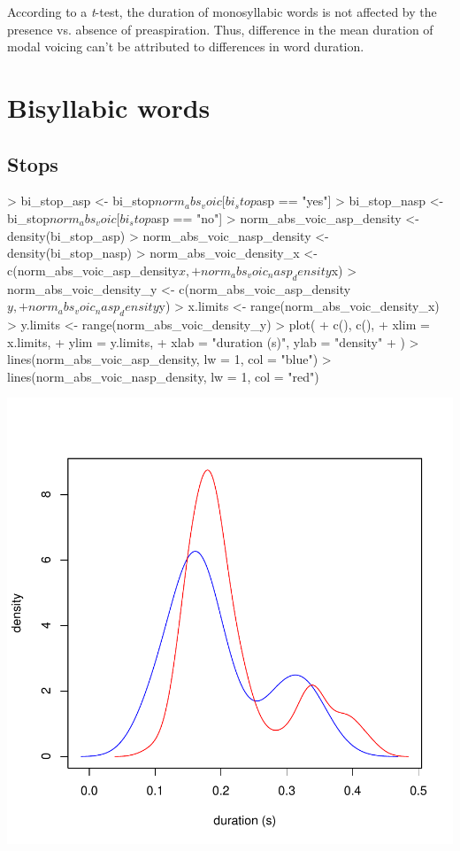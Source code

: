 \documentclass[a4paper,11pt]{article}
\begin{document}
According to a \textit{t}-test, the duration of monosyllabic words is not affected by the presence vs. absence of preaspiration.
Thus, difference in the mean duration of modal voicing can't be attributed to differences in word duration. 

\section{Bisyllabic words}

\subsection{Stops}

\begin{Schunk}
\begin{Sinput}
> bi_stop_asp <- bi_stop$norm_abs_voic[bi_stop$asp == "yes"]
> bi_stop_nasp <- bi_stop$norm_abs_voic[bi_stop$asp == "no"]
> norm_abs_voic_asp_density <- density(bi_stop_asp)
> norm_abs_voic_nasp_density <- density(bi_stop_nasp)
> norm_abs_voic_density_x <- c(norm_abs_voic_asp_density$x, 
+                                   norm_abs_voic_nasp_density$x)
> norm_abs_voic_density_y <- c(norm_abs_voic_asp_density$y, 
+                                   norm_abs_voic_nasp_density$y)
> x.limits <- range(norm_abs_voic_density_x)
> y.limits <- range(norm_abs_voic_density_y)
> plot(
+ c(), c(),
+ xlim = x.limits,
+ ylim = y.limits,
+ xlab = "duration (s)", ylab = "density"
+ )
> lines(norm_abs_voic_asp_density, lw = 1, col = "blue")
> lines(norm_abs_voic_nasp_density, lw = 1, col = "red")
\end{Sinput}
\end{Schunk}
\includegraphics{analysis-020}
\end{document}
